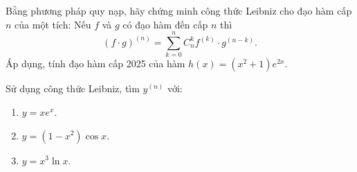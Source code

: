 \begin{exercise}
    Bằng phương pháp quy nạp, hãy chứng minh công thức Leibniz cho đạo hàm cấp $n$ của một tích: Nếu $f$ và $g$ có đạo hàm đến cấp $n$ thì
    \[ (f \cdot g)^{(n)} = \sum_{k=0}^{n} C_{n}^{k} f^{(k)} \cdot g^{(n-k)}. \]
    Áp dụng, tính đạo hàm cấp 2025 của hàm $h(x) = (x^2+1)e^{2x}$.
\end{exercise}

\begin{exercise}
    Sử dụng công thức Leibniz, tìm $y^{(n)}$ với:
    \begin{enumerate}[label=(\alph*)]
        \item $y = x e^x$.
        \item $y = (1-x^2)\cos x$.
        \item $y = x^3 \ln x$.
    \end{enumerate}
\end{exercise}
